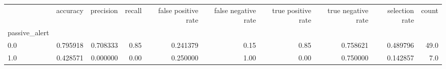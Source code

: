 \begin{tabular}{lrrrrrrrrr}
\toprule
{} &  accuracy &  precision &  recall &  false positive rate &  false negative rate &  true positive rate &  true negative rate &  selection rate &  count \\
passive\_alert &           &            &         &                      &                      &                     &                     &                 &        \\
\midrule
0.0           &  0.795918 &   0.708333 &    0.85 &             0.241379 &                 0.15 &                0.85 &            0.758621 &        0.489796 &   49.0 \\
1.0           &  0.428571 &   0.000000 &    0.00 &             0.250000 &                 1.00 &                0.00 &            0.750000 &        0.142857 &    7.0 \\
\bottomrule
\end{tabular}
